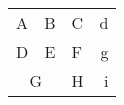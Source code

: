 \documentclass[a4paper]{article}
\begin{document}
\begin{center}
    \begin{tabular}[c]{|l|c||p{3em}r@{-}} 
    \hline
    A & B & C & d \\
    D & E & F & g \\
    \multicolumn{2}{|c|}{G} & H & i \\
    \hline
    \end{tabular}
\end{center}
\end{document}

